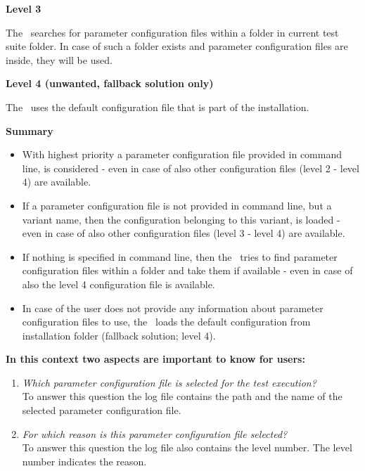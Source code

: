 \textbf{Level 3}

The \pkg\ searches for parameter configuration files within a folder  in current test suite folder.
In case of such a folder exists and parameter configuration files are inside, they will be used.

\textbf{Level 4 (unwanted, fallback solution only)}

The \pkg\ uses the default configuration file that is part of the installation.

\vspace{2ex}

\textbf{Summary}

\begin{itemize}
   \item With highest priority a parameter configuration file provided in command line, is considered - even in case of also other
configuration files (level 2 - level 4) are available.
   \item If a parameter configuration file is not provided in command line, but a variant name, then the configuration belonging
to this variant, is loaded - even in case of also other configuration files (level 3 - level 4) are available.
   \item If nothing is specified in command line, then the \pkg\ tries to find parameter configuration files within a  folder
and take them if available - even in case of also the level 4 configuration file is available.
   \item In case of the user does not provide any information about parameter configuration files to use, the \pkg\ loads the
default configuration from installation folder (fallback solution; level 4).
\end{itemize}

\textbf{In this context two aspects are important to know for users:}

\begin{enumerate}
   \item \textit{Which parameter configuration file is selected for the test execution?}\\
To answer this question the log file contains the path and the name of the selected parameter configuration file.
   \item \textit{For which reason is this parameter configuration file selected?}\\
To answer this question the log file also contains the level number. The level number indicates the reason.
\end{enumerate}

